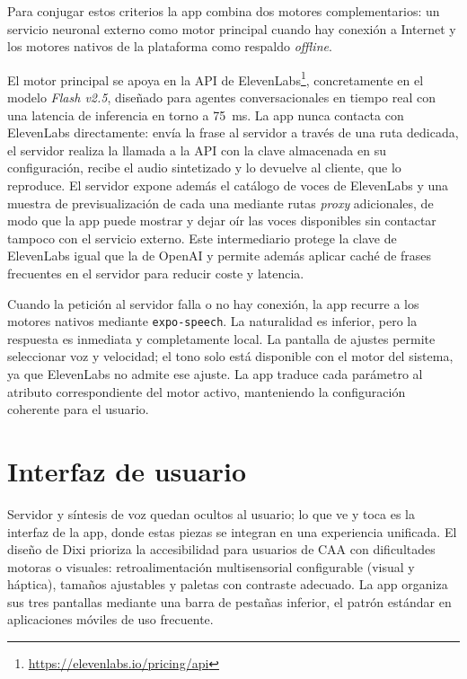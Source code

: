 Para conjugar estos criterios la app combina dos motores complementarios: un servicio neuronal externo como motor principal cuando hay conexión a Internet y los motores nativos de la plataforma como respaldo \textit{offline}.

El motor principal se apoya en la API de ElevenLabs\footnote{\url{https://elevenlabs.io/pricing/api}}, concretamente en el modelo \textit{Flash v2.5}, diseñado para agentes conversacionales en tiempo real con una latencia de inferencia en torno a 75~ms. La app nunca contacta con ElevenLabs directamente: envía la frase al servidor a través de una ruta dedicada, el servidor realiza la llamada a la API con la clave almacenada en su configuración, recibe el audio sintetizado y lo devuelve al cliente, que lo reproduce. El servidor expone además el catálogo de voces de ElevenLabs y una muestra de previsualización de cada una mediante rutas \textit{proxy} adicionales, de modo que la app puede mostrar y dejar oír las voces disponibles sin contactar tampoco con el servicio externo. Este intermediario protege la clave de ElevenLabs igual que la de OpenAI y permite además aplicar caché de frases frecuentes en el servidor para reducir coste y latencia.

Cuando la petición al servidor falla o no hay conexión, la app recurre a los motores nativos mediante \texttt{expo-speech}. La naturalidad es inferior, pero la respuesta es inmediata y completamente local. La pantalla de ajustes permite seleccionar voz y velocidad; el tono solo está disponible con el motor del sistema, ya que ElevenLabs no admite ese ajuste. La app traduce cada parámetro al atributo correspondiente del motor activo, manteniendo la configuración coherente para el usuario.

\section{Interfaz de usuario}
\label{sec:app-interfaz}

Servidor y síntesis de voz quedan ocultos al usuario; lo que ve y toca es la interfaz de la app, donde estas piezas se integran en una experiencia unificada. El diseño de Dixi prioriza la accesibilidad para usuarios de CAA con dificultades motoras o visuales: retroalimentación multisensorial configurable (visual y háptica), tamaños ajustables y paletas con contraste adecuado. La app organiza sus tres pantallas mediante una barra de pestañas inferior, el patrón estándar en aplicaciones móviles de uso frecuente.

